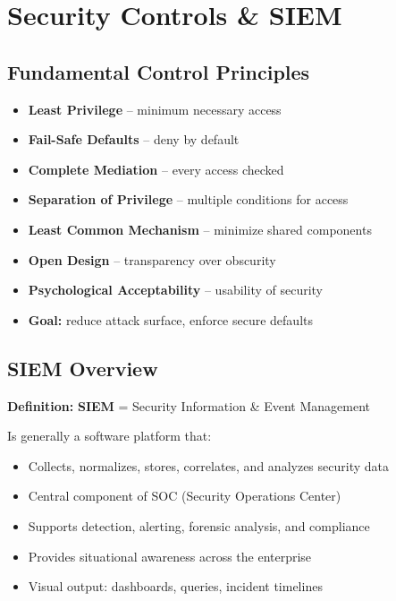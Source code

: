 \section{Security Controls \& SIEM}

\subsection{Fundamental Control Principles}
{
\begin{itemize}[noitemsep]
  \item \textbf{Least Privilege} – minimum necessary access
  \item \textbf{Fail-Safe Defaults} – deny by default
  \item \textbf{Complete Mediation} – every access checked
  \item \textbf{Separation of Privilege} – multiple conditions for access
  \item \textbf{Least Common Mechanism} – minimize shared components
  \item \textbf{Open Design} – transparency over obscurity
  \item \textbf{Psychological Acceptability} – usability of security
  \item \textbf{Goal:} reduce attack surface, enforce secure defaults
\end{itemize}
}

\subsection{SIEM Overview}
{
\textbf{Definition:} \textbf{SIEM} = Security Information \& Event Management

Is generally a software platform that:
\begin{itemize}[noitemsep]
  \item Collects, normalizes, stores, correlates, and analyzes security data
  \item Central component of SOC (Security Operations Center)
  \item Supports detection, alerting, forensic analysis, and compliance
  \item Provides situational awareness across the enterprise
  \item Visual output: dashboards, queries, incident timelines
\end{itemize}
}

